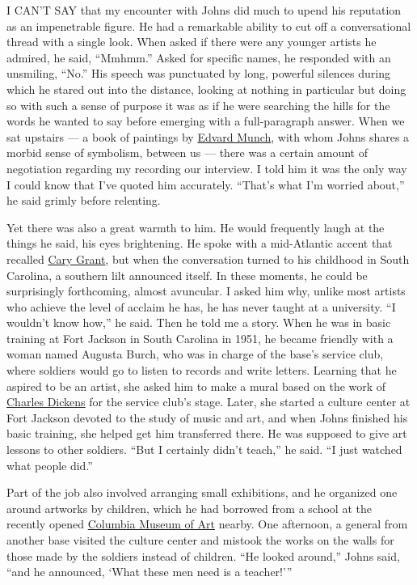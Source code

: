 I CAN'T SAY that my encounter with Johns did much to upend his
reputation as an impenetrable figure. He had a remarkable ability to cut
off a conversational thread with a single look. When asked if there were
any younger artists he admired, he said, ``Mmhmm.'' Asked for specific
names, he responded with an unsmiling, ``No.'' His speech was punctuated
by long, powerful silences during which he stared out into the distance,
looking at nothing in particular but doing so with such a sense of
purpose it was as if he were searching the hills for the words he wanted
to say before emerging with a full-paragraph answer. When we sat
upstairs --- a book of paintings by
\href{https://www.nytimes.com/topic/person/edvard-munch}{Edvard Munch},
with whom Johns shares a morbid sense of symbolism, between us --- there
was a certain amount of negotiation regarding my recording our
interview. I told him it was the only way I could know that I've quoted
him accurately. ``That's what I'm worried about,'' he said grimly before
relenting.

Yet there was also a great warmth to him. He would frequently laugh at
the things he said, his eyes brightening. He spoke with a mid-Atlantic
accent that recalled
\href{https://www.nytimes.com/1986/11/30/obituaries/cary-grant-dies-in-iowa-at-82-hollywood-epitome-of-style.html}{Cary
Grant}, but when the conversation turned to his childhood in South
Carolina, a southern lilt announced itself. In these moments, he could
be surprisingly forthcoming, almost avuncular. I asked him why, unlike
most artists who achieve the level of acclaim he has, he has never
taught at a university. ``I wouldn't know how,'' he said. Then he told
me a story. When he was in basic training at Fort Jackson in South
Carolina in 1951, he became friendly with a woman named Augusta Burch,
who was in charge of the base's service club, where soldiers would go to
listen to records and write letters. Learning that he aspired to be an
artist, she asked him to make a mural based on the work of
\href{https://www.nytimes.com/topic/person/charles-dickens}{Charles
Dickens} for the service club's stage. Later, she started a culture
center at Fort Jackson devoted to the study of music and art, and when
Johns finished his basic training, she helped get him transferred there.
He was supposed to give art lessons to other soldiers. ``But I certainly
didn't teach,'' he said. ``I just watched what people did.''

Part of the job also involved arranging small exhibitions, and he
organized one around artworks by children, which he had borrowed from a
school at the recently opened
\href{https://www.columbiamuseum.org/}{Columbia Museum of Art} nearby.
One afternoon, a general from another base visited the culture center
and mistook the works on the walls for those made by the soldiers
instead of children. ``He looked around,'' Johns said, ``and he
announced, `What these men need is a teacher!'''

